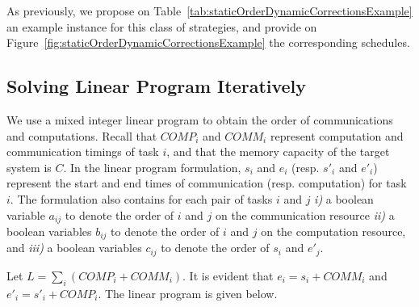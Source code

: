 \documentclass[sigconf]{acmart}
\begin{document}
	
	
	As previously, we propose on Table~\ref{tab:staticOrderDynamicCorrectionsExample} an example instance for this class of strategies, and provide on Figure~\ref{fig:staticOrderDynamicCorrectionsExample} the corresponding schedules.
	
	
	\subsection{Solving Linear Program Iteratively}
	\label{subsec:linearprogrammingformulation}
	We use a mixed integer linear program to obtain the order of communications and computations. Recall that $COMP_i$ and $COMM_i$ represent computation and communication timings of task $i$, and that the memory capacity of the target system is $C$. In the linear program formulation, $s_i$ and $e_i$ (resp. $s'_i$ and $e'_i$) represent the start and end times of communication (resp. computation) for task $i$. The formulation also contains for each pair of tasks $i$ and $j$ \textit{i)} a boolean variable $a_{ij}$ to denote the order of $i$ and $j$ on the communication resource \textit{ii)} a boolean variables $b_{ij}$ to denote the order of $i$ and $j$ on the computation resource, and \textit{iii)} a boolean variables $c_{ij}$ to denote the order of $s_i$ and $e'_j$. 
	
	
	
	
	
	
	\noindent Let $L=\sum_i (COMP_i + COMM_i)$. It is evident that $e_i =s_i + COMM_i$ and $e'_i =s'_i + COMP_i$. The linear program is given below.
	
\end{document}
